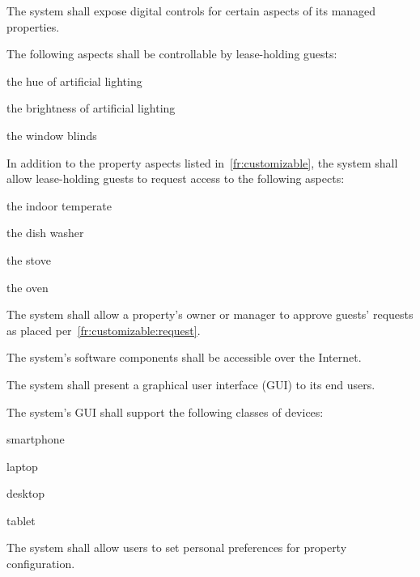 \documentclass[letter,titlepage,oneside,english]{report}
\begin{document}
\begin{fr}
  The system shall expose digital controls for certain aspects of its managed properties.
  \begin{fr}
  \item\label{fr:customizable}
    The following aspects shall be controllable by lease-holding guests:
    \begin{fr}
    \item
      the hue of artificial lighting
    \item
      the brightness of artificial lighting
    \item
      the window blinds
    \end{fr}
  \item\label{fr:customizable:request}
    In addition to the property aspects listed in~\ref{fr:customizable}, the system shall allow lease-holding guests to request access to the following aspects:
    \begin{fr}
    \item
      the indoor temperate
    \item
      the dish washer
    \item
      the stove
    \item
      the oven
    \end{fr}
  \item\label{fr:customizable:request_approve}
    The system shall allow a property's owner or manager to approve guests' requests as placed per~\ref{fr:customizable:request}.
  \end{fr}
\item\label{fr:software}
  The system's software components shall be accessible over the Internet.
  \begin{fr}
  \item\label{fr:software:ui}
    The system shall present a graphical user interface (GUI) to its end users.
  \item\label{fr:software:devices}
    The system's GUI shall support the following classes of devices:
    \begin{fr}
    \item
      smartphone
    \item
      laptop
    \item
      desktop
    \item
      tablet
    \end{fr}
  \end{fr}
\item
  The system shall allow users to set personal preferences for property configuration.
  \begin{fr}

\end{fr}
\end{fr}
\end{document}
